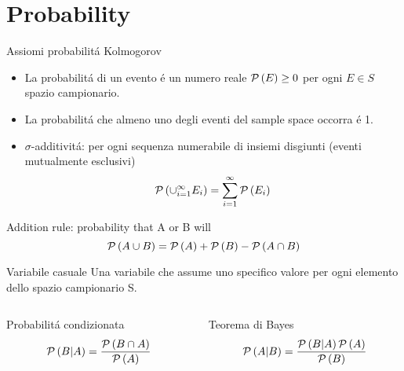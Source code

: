 \section{Probability}

\begin{frame}{Assiomi probabilit\'a Kolmogorov}
\begin{itemize}
\item La probabilit\'a di un evento \'e un numero reale $\operatorname{\mathcal{P}}{(E)}\geq0$ per ogni $E\in S$ spazio campionario.
\item La probabilit\'a che almeno uno degli eventi del sample space occorra \'e 1.
\item $\sigma$-additivit\'a: per ogni sequenza numerabile di insiemi disgiunti (eventi mutualmente esclusivi)
\begin{equation*}
\operatorname{\mathcal{P}}{(\cup_{i=1}^{\infty}E_i)}=\sum_{i=1}^{\infty}\operatorname{\mathcal{P}}{(E_i)}
\end{equation*}
\end{itemize}
\begin{block}{Addition rule: probability that A or B will}
\begin{equation*}
\operatorname{\mathcal{P}}{(A\cup B)}=\operatorname{\mathcal{P}}{(A)}+\operatorname{\mathcal{P}}{(B)}-\operatorname{\mathcal{P}}{(A\cap B)}
\end{equation*}
\end{block}
\begin{block}{Variabile casuale}
Una variabile che assume uno specifico valore per ogni elemento dello spazio campionario S.
\end{block}
\begin{columns}[T]
\begin{column}{0.5\textwidth}

\begin{block}{Probabilit\'a condizionata}
\begin{equation*}
\operatorname{\mathcal{P}}{(B|A)}=\frac{\operatorname{\mathcal{P}}{(B\cap A)}}{\operatorname{\mathcal{P}}{(A)}}
\end{equation*}
\end{block}

\end{column}

\begin{column}{0.5\textwidth}

\begin{block}{Teorema di Bayes}
\begin{equation*}
\operatorname{\mathcal{P}}{(A|B)}=\frac{\operatorname{\mathcal{P}}{(B|A)}\operatorname{\mathcal{P}}{(A)}}{\operatorname{\mathcal{P}}{(B)}}
\end{equation*}
\end{block}

\end{column}
\end{columns}
\end{frame}

